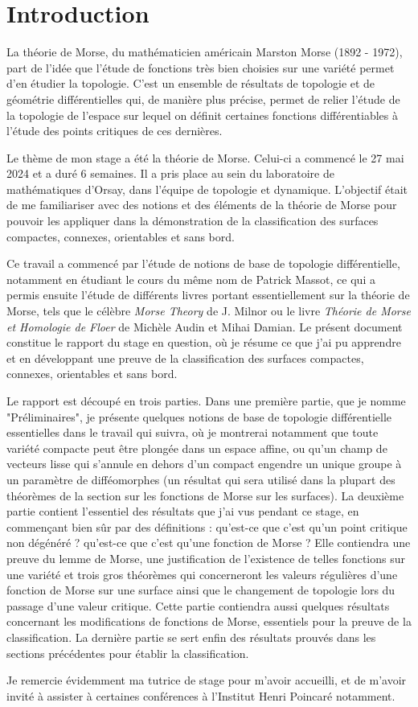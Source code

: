 \section{Introduction}
La théorie de Morse, du mathématicien américain 
Marston Morse (1892 - 1972), part de l'idée que 
l'étude de fonctions très bien choisies sur une 
variété permet d'en étudier la topologie. 
C'est un ensemble de résultats de topologie et 
de géométrie différentielles qui, de manière 
plus précise, permet de relier l'étude de la 
topologie de l'espace sur lequel on définit 
certaines fonctions différentiables à l'étude 
des points critiques de ces dernières.


Le thème de mon stage a été la théorie de Morse. 
Celui-ci a commencé le 27 mai 2024 et a duré 6 semaines.
Il a pris place au sein du laboratoire de mathématiques 
d'Orsay,  dans l'équipe de topologie et dynamique.
L'objectif était de me familiariser avec des notions et 
des éléments de la théorie de Morse pour pouvoir les 
appliquer dans la démonstration de la classification des 
surfaces compactes, connexes, orientables et sans bord.

Ce travail a commencé par l'étude de notions de base de 
topologie différentielle, notamment en étudiant le cours 
du même nom de Patrick Massot, ce qui a permis ensuite 
l'étude de différents livres portant essentiellement sur 
la théorie de Morse, tels que le célèbre \textit{Morse Theory} 
de J. Milnor ou le livre \textit{Théorie de Morse et Homologie de Floer} 
de Michèle Audin et Mihai Damian. Le présent document 
constitue le rapport du stage en question, où je résume 
ce que j'ai pu apprendre et en développant une preuve de 
la classification des surfaces compactes, connexes, orientables 
et sans bord.


Le rapport est découpé en trois parties.  Dans une première 
partie, que je nomme "Préliminaires", je présente quelques 
notions de base de topologie différentielle essentielles 
dans le travail qui suivra, où je montrerai notamment que toute variété 
compacte peut être plongée dans un espace affine, ou qu'un champ de
vecteurs lisse  qui s'annule en dehors d'un compact engendre un unique 
groupe à un paramètre de difféomorphes (un résultat qui sera utilisé 
dans la plupart des théorèmes de la section sur les fonctions 
de Morse sur les surfaces). La deuxième partie contient l'essentiel 
des résultats que j'ai vus pendant ce stage, en commençant bien sûr 
par des définitions : qu'est-ce que c'est qu'un point critique non dégénéré ?
qu'est-ce que c'est qu'une fonction de Morse ? 
Elle contiendra une preuve du lemme de Morse, une justification de 
l'existence de telles fonctions sur une variété et trois gros théorèmes 
qui concerneront les valeurs régulières d'une fonction de Morse sur une 
surface ainsi que le changement de topologie lors du passage d'une valeur 
critique.  Cette partie contiendra aussi quelques résultats concernant
les modifications de fonctions de Morse, essentiels pour la preuve de 
la classification. La dernière partie se sert enfin des résultats prouvés 
dans les sections précédentes pour établir la classification.


Je remercie évidemment ma tutrice de stage pour m'avoir accueilli, et 
de m'avoir invité à assister à certaines conférences à l'Institut Henri 
Poincaré notamment.


